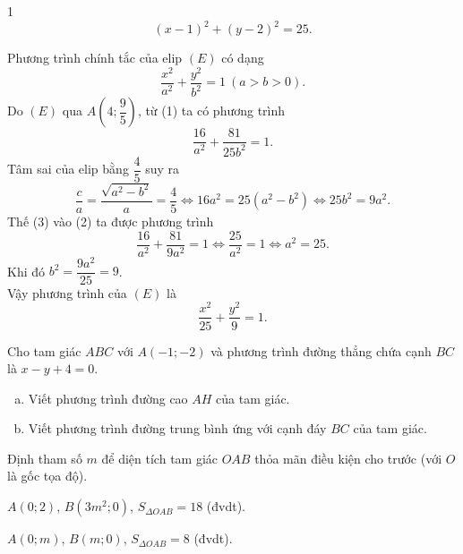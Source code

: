 \begin{bt}
{\begin{enumEX}{1}
			\[(x-1)^2+(y-2)^2=25.\]
			\item Phương trình chính tắc của elip $(E)$ có dạng 
			\[\dfrac{x^2}{a^2}+\dfrac{y^2}{b^2}=1~(a>b>0).\tag{1}\]
			Do $(E)$ qua $A\left(4;\dfrac{9}{5}\right)$, từ (1) ta có phương trình 
			\[\dfrac{16}{a^2}+\dfrac{81}{25b^2}=1.\tag{2}\]
			Tâm sai của elip bằng $\dfrac{4}{5}$ suy ra
			\[\dfrac{c}{a}=\dfrac{\sqrt{a^2-b^2}}{a}=\dfrac{4}{5}\Leftrightarrow 16a^2=25(a^2-b^2)\Leftrightarrow 25b^2=9a^2.\tag{3}\]
			Thế (3) vào (2) ta được phương trình 
			\[\dfrac{16}{a^2}+\dfrac{81}{9a^2}=1\Leftrightarrow \dfrac{25}{a^2}=1\Leftrightarrow a^2=25.\]
			Khi đó $b^2=\dfrac{9a^2}{25}=9$.\\
			Vậy phương trình của $(E)$ là
			\[\dfrac{x^2}{25}+\dfrac{y^2}{9}=1.\]
		\end{enumEX}
	}
\end{bt}

\begin{bt}%
	Cho tam giác $ABC$ với $A(-1;-2)$ và phương trình đường thẳng chứa cạnh $BC$ là $x-y+4=0$.
	\begin{enumerate}[a)]
	\item Viết phương trình đường cao $AH$ của tam giác.
	\item Viết phương trình đường trung bình ứng với cạnh đáy $BC$ của tam giác.
	\end{enumerate}
	\end{bt}

\begin{bt}%
	Định tham số $m$ để diện tích tam giác $OAB$ thỏa mãn điều kiện cho trước (với $O$ là gốc tọa độ).
	\begin{listEX}[1]
		\item $A(0;2)$, $B(3m^2;0)$, $S_{\Delta OAB}=18$ (đvdt).
		\item $A(0;m)$, $B(m;0)$, $S_{\Delta OAB}=8$ (đvdt).
	\end{listEX}
\end{bt}

